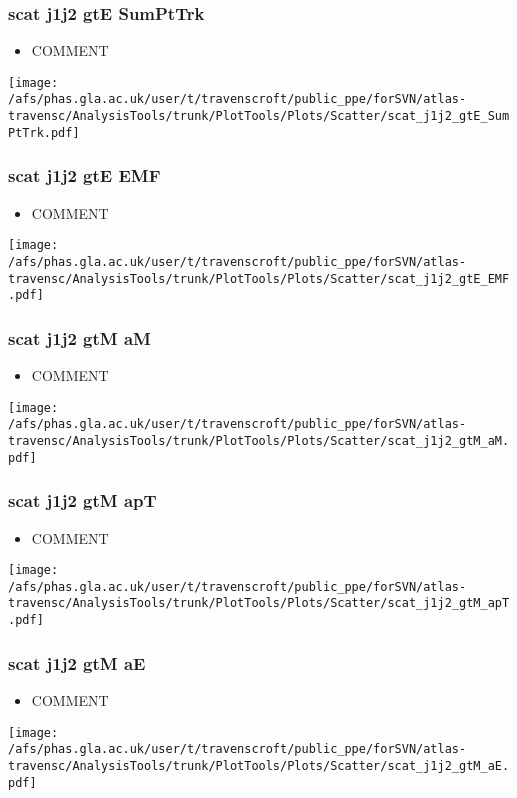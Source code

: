 \documentclass{beamer}
\begin{document}
\begin{frame}
\frametitle{scat j1j2 gtE SumPtTrk}
\begin{itemize}
\item COMMENT
\end{itemize}
\begin{center}
\texttt{[image: /afs/phas.gla.ac.uk/user/t/travenscroft/public\_ppe/forSVN/atlas-travensc/AnalysisTools/trunk/PlotTools/Plots/Scatter/scat\_j1j2\_gtE\_SumPtTrk.pdf]}
\end{center}
\end{frame}

\begin{frame}
\frametitle{scat j1j2 gtE EMF}
\begin{itemize}
\item COMMENT
\end{itemize}
\begin{center}
\texttt{[image: /afs/phas.gla.ac.uk/user/t/travenscroft/public\_ppe/forSVN/atlas-travensc/AnalysisTools/trunk/PlotTools/Plots/Scatter/scat\_j1j2\_gtE\_EMF.pdf]}
\end{center}
\end{frame}

\begin{frame}
\frametitle{scat j1j2 gtM aM}
\begin{itemize}
\item COMMENT
\end{itemize}
\begin{center}
\texttt{[image: /afs/phas.gla.ac.uk/user/t/travenscroft/public\_ppe/forSVN/atlas-travensc/AnalysisTools/trunk/PlotTools/Plots/Scatter/scat\_j1j2\_gtM\_aM.pdf]}
\end{center}
\end{frame}

\begin{frame}
\frametitle{scat j1j2 gtM apT}
\begin{itemize}
\item COMMENT
\end{itemize}
\begin{center}
\texttt{[image: /afs/phas.gla.ac.uk/user/t/travenscroft/public\_ppe/forSVN/atlas-travensc/AnalysisTools/trunk/PlotTools/Plots/Scatter/scat\_j1j2\_gtM\_apT.pdf]}
\end{center}
\end{frame}

\begin{frame}
\frametitle{scat j1j2 gtM aE}
\begin{itemize}
\item COMMENT
\end{itemize}
\begin{center}
\texttt{[image: /afs/phas.gla.ac.uk/user/t/travenscroft/public\_ppe/forSVN/atlas-travensc/AnalysisTools/trunk/PlotTools/Plots/Scatter/scat\_j1j2\_gtM\_aE.pdf]}
\end{center}
\end{frame}
\end{document}
